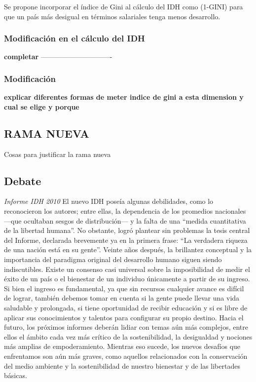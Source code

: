 \documentclass[
  10pt,
]{article}
\begin{document}
Se propone incorporar el índice de Gini al cálculo del IDH como (1-GINI)
para que un país más desigual en términos salariales tenga menos
desarrollo.

\hypertarget{modificaciuxf3n-en-el-cuxe1lculo-del-idh-1}{%
\subsubsection{Modificación en el cálculo del
IDH}\label{modificaciuxf3n-en-el-cuxe1lculo-del-idh-1}}

\textbf{completar} -------------------------------

\hypertarget{modificaciuxf3n}{%
\subsubsection{Modificación}\label{modificaciuxf3n}}

\textbf{explicar diferentes formas de meter indice de gini a esta
dimension y cual se elige y porque}

\hypertarget{rama-nueva}{%
\subsection{RAMA NUEVA}\label{rama-nueva}}

Cosas para justificar la rama nueva

\hypertarget{debate-2}{%
\subsection{Debate}\label{debate-2}}

\emph{Informe IDH 2010} El nuevo IDH poseía algunas debilidades, como lo
reconocieron los autores; entre ellas, la dependencia de los promedios
nacionales ---que ocultaban sesgos de distribución--- y la falta de una
``medida cuantitativa de la libertad humana''. No obstante, logró
plantear sin problemas la tesis central del Informe, declarada
brevemente ya en la primera frase: ``La verdadera riqueza de una nación
está en su gente''. Veinte años después, la brillantez conceptual y la
importancia del paradigma original del desarrollo humano siguen siendo
indiscutibles. Existe un consenso casi universal sobre la imposibilidad
de medir el éxito de un país o el bienestar de un individuo únicamente a
partir de su ingreso. Si bien el ingreso es fundamental, ya que sin
recursos cualquier avance es difícil de lograr, también debemos tomar en
cuenta si la gente puede llevar una vida saludable y prolongada, si
tiene oportunidad de recibir educación y si es libre de aplicar sus
conocimientos y talentos para configurar su propio destino. Hacia el
futuro, los próximos informes deberán lidiar con temas aún más
complejos, entre ellos el ámbito cada vez más crítico de la
sostenibilidad, la desigualdad y nociones más amplias de empoderamiento.
Mientras eso sucede, los nuevos desafíos que enfrentamos son aún más
graves, como aquellos relacionados con la conservación del medio
ambiente y la sostenibilidad de nuestro bienestar y de las libertades
básicas.
\end{document}
